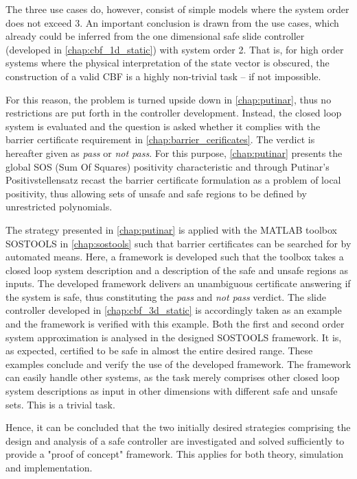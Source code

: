 The three use cases do, however, consist of simple models where the system order does not exceed 3. An important conclusion is drawn from the use cases, which already could be inferred from the one dimensional safe slide controller (developed in \autoref{chap:cbf_1d_static}) with system order 2. That is, for high order systems where the physical interpretation of the state vector is obscured, the construction of a valid CBF is a highly non-trivial task -- if not impossible. 

For this reason, the problem is turned upside down in \autoref{chap:putinar}, thus no restrictions are put forth in the controller development. Instead, the closed loop system is evaluated and the question is asked whether it complies with the barrier certificate requirement in \autoref{chap:barrier_cerificates}. The verdict is hereafter given as \textit{pass} or \textit{not pass}. For this purpose, \autoref{chap:putinar} presents the global SOS (Sum Of Squares) positivity characteristic and through Putinar's Positivstellensatz recast the barrier certificate formulation as a  problem of local positivity, thus allowing sets of unsafe and safe regions to be defined by unrestricted polynomials.

The strategy presented in \autoref{chap:putinar} is applied with the MATLAB toolbox SOSTOOLS in \autoref{chap:sostools} such that  barrier certificates can be searched for by automated means. Here, a framework is developed such that the toolbox takes a closed loop system description and a description of the safe and unsafe regions as inputs. The developed framework delivers an unambiguous certificate answering if the system is safe, thus constituting the \textit{pass} and \textit{not pass} verdict. The slide controller developed in \autoref{chap:cbf_3d_static} is accordingly taken as an example and the framework is verified with this example. Both the first and second order system approximation is analysed in the designed SOSTOOLS framework. It is, as expected, certified to be safe in almost the entire desired range.  These examples conclude and verify the use of the developed framework. The framework can easily handle other systems, as the task merely comprises other closed loop system descriptions as input in other dimensions with different safe and unsafe sets. This is a trivial task.

Hence, it can be concluded that the two initially desired strategies comprising the design and analysis of a safe controller are investigated and solved sufficiently to provide a "proof of concept" framework. This applies for both theory, simulation and implementation.


